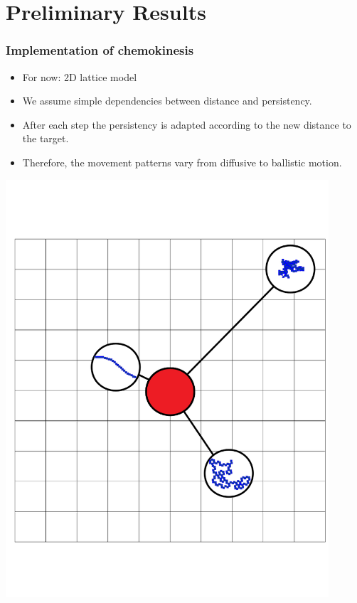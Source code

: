 \documentclass[11pt]{beamer}
\begin{document}
\section{Preliminary Results}


\begin{frame}
 \frametitle{Implementation of chemokinesis}
 
 \begin{minipage}[h]{0.49\textwidth}
   \begin{itemize}
   \item For now: 2D lattice model
  \item We assume simple dependencies between distance and persistency.
  \item After each step the persistency is adapted according to the new distance to the target.
  \item Therefore, the movement patterns vary from diffusive to ballistic motion.
 \end{itemize}
 \end{minipage}
 \begin{minipage}[h]{0.49\textwidth}
  \centering
  \includegraphics[width=0.9\textwidth]{gfx/profileScheme.png}
 \end{minipage}
\end{frame}
\end{document}
